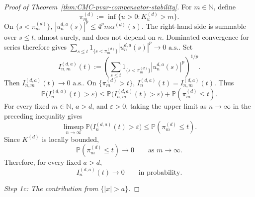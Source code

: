 \documentclass[a4paper,10pt]{article}
\renewcommand{\P}{\mathbb P}
\begin{document}
\begin{proof}[Proof of Theorem~\ref{thm:CMC-pvar-compensator-stability}]
For \(m\in\mathbb N\), define
\[
\pi_m^{(d)}
:=
\inf\{u>0:K_u^{(d)}>m\}.
\]
On \(\{s<\pi_m^{(d)}\}\),
$
        |u_n^{d,a}(s)|^p
        \le
        4^pm\alpha^{(d)}(s).
$
The right-hand side is summable over \(s\le t\), almost surely, and
does not depend on \(n\). Dominated convergence for series therefore
gives
$
\sum_{s\le t}
1_{\{s<\pi_m^{(d)}\}}
|u_n^{d,a}(s)|^p
\longrightarrow0
\text{ a.s..}
$
Set
\[
I_{n,m}^{(d,a)}(t)
:=
\left(
\sum_{s\le t}
1_{\{s<\pi_m^{(d)}\}}
|u_n^{d,a}(s)|^p
\right)^{1/p}.
\]
Then
$
        I_{n,m}^{(d,a)}(t)\longrightarrow0
        \text{ a.s..}
$
On \(\{\pi_m^{(d)}>t\}\),
$
        I_n^{(d,a)}(t)=I_{n,m}^{(d,a)}(t).
$
Thus
\[
\P\bigl(I_n^{(d,a)}(t)>\varepsilon\bigr)
\le
\P\bigl(I_{n,m}^{(d,a)}(t)>\varepsilon\bigr)
+
\P(\pi_m^{(d)}\le t).
\]
For every fixed \(m\in\mathbb N\), \(a>d\), and
\(\varepsilon>0\), taking the upper limit as \(n\to\infty\)
in the preceding inequality gives
\[
\limsup_{n\to\infty}
\P\bigl(I_n^{(d,a)}(t)>\varepsilon\bigr)
\le
\P(\pi_m^{(d)}\le t).
\]
Since \(K^{(d)}\) is locally bounded,
\[
        \P(\pi_m^{(d)}\le t)\longrightarrow0
        \qquad\text{as }m\to\infty.
\]
Therefore, for every fixed \(a>d\),
\[
        I_n^{(d,a)}(t)
        \longrightarrow0
        \qquad\text{in probability}.
\]

\medskip
\noindent
\textit{Step 1c: The contribution from \(\{|x|>a\}\).}
\medskip


\end{proof}
\end{document}
